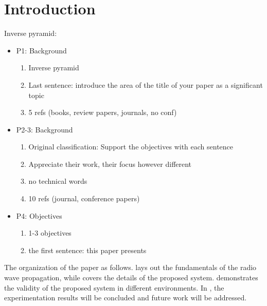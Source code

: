 \section{Introduction}
\label{sec:intro}
    Inverse pyramid:
    \begin{itemize}
        \item P1: Background
        \begin{enumerate}
          \item Inverse pyramid
          \item Last sentence: introduce the area of the title of your paper as a significant topic
          \item 5 refs (books, review papers, journals, no conf)
        \end{enumerate}
        \item P2-3: Background
        \begin{enumerate}
          \item Original classification: Support the objectives with each sentence
          \item Appreciate their work, their focus however different
          \item no technical words
          \item 10 refs (journal, conference papers)
        \end{enumerate}
        \item P4: Objectives
        \begin{enumerate}
          \item 1-3 objectives
          \item the first sentence: this paper presents
        \end{enumerate}
    \end{itemize}

    The organization of the paper as follows.
     lays out the fundamentals of the radio wave propagation, while  covers the details of the proposed system.
     demonstrates the validity of the proposed system in different environments.
    In , the experimentation results will be concluded and future work will be addressed.
